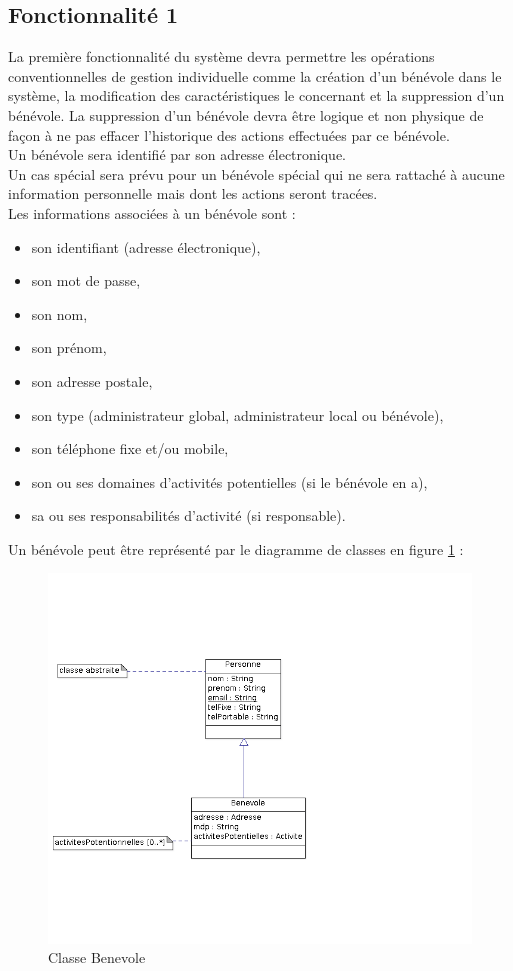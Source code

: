 \subsection{Fonctionnalité 1}
La première fonctionnalité du système devra permettre les opérations conventionnelles de gestion individuelle comme la création d'un bénévole dans le système, la modification des caractéristiques le concernant et la suppression d'un bénévole. La suppression d'un bénévole devra être logique et non physique de façon à ne pas effacer l'historique des actions effectuées par ce bénévole. \\
Un bénévole sera identifié par son adresse électronique.\\ 
Un cas spécial sera prévu pour un bénévole spécial qui ne sera rattaché à aucune information personnelle mais dont les actions seront tracées.\\
Les informations associées à un bénévole sont :
\begin{itemize}
\item son identifiant (adresse électronique),
\item son mot de passe,
\item son nom,
\item son prénom,
\item son adresse postale,
\item son type (administrateur global, administrateur local ou bénévole),
\item son téléphone fixe et/ou mobile,
\item son ou ses domaines d'activités potentielles (si le bénévole en a),
\item sa ou ses responsabilités d'activité (si responsable).
\\
\end{itemize}
Un bénévole peut être représenté par le diagramme de classes en figure \ref{classeBenevole} :
\begin{figure}[H]
	\centering
	\includegraphics[scale=0.4]{images/classeBenevole.png}
	 \caption{Classe Benevole}
	 \label{classeBenevole}
\end{figure}

